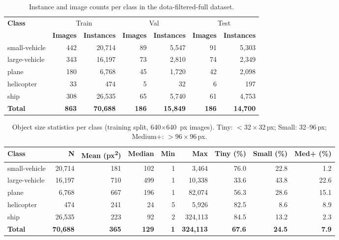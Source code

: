 \begin{table}[htbp]
\centering
\caption{Instance and image counts per class in the dota-filtered-full dataset.}
\label{tab:dota_filtered_full_counts}
\begin{tabular}{lrrrrrr}
\toprule
\textbf{Class} & \multicolumn{2}{c}{Train} & \multicolumn{2}{c}{Val} & \multicolumn{2}{c}{Test} \\
\cmidrule(lr){2-3} \cmidrule(lr){4-5} \cmidrule(lr){6-7}
 & \textbf{Images} & \textbf{Instances} & \textbf{Images} & \textbf{Instances} & \textbf{Images} & \textbf{Instances} \\
\midrule
small-vehicle & 442 & 20,714 & 89 & 5,547 & 91 & 5,303 \\
large-vehicle & 343 & 16,197 & 73 & 2,810 & 74 & 2,349 \\
plane & 180 & 6,768 & 45 & 1,720 & 42 & 2,098 \\
helicopter & 33 & 474 & 5 & 32 & 6 & 197 \\
ship & 308 & 26,535 & 65 & 5,740 & 61 & 4,753 \\
\midrule
\textbf{Total} & \textbf{863} & \textbf{70,688} & \textbf{186} & \textbf{15,849} & \textbf{186} & \textbf{14,700} \\
\bottomrule
\end{tabular}
\end{table}

\begin{table}[htbp]
\centering
\caption{Object size statistics per class (training split, 640$\times$640~px images). Tiny: $<$32\,$\times$\,32\,px; Small: 32--96\,px; Medium+: $>$96\,$\times$\,96\,px.}
\label{tab:dota_filtered_full_sizes}
\begin{tabular}{lrrrrrrrr}
\toprule
\textbf{Class} & \textbf{N} & \textbf{Mean (px\textsuperscript{2})} & \textbf{Median} & \textbf{Min} & \textbf{Max} & \textbf{Tiny (\%)} & \textbf{Small (\%)} & \textbf{Med+ (\%)} \\
\midrule
small-vehicle & 20,714 & 181 & 102 & 1 & 3,464 & 76.0 & 22.8 & 1.2 \\
large-vehicle & 16,197 & 710 & 499 & 1 & 10,338 & 33.6 & 43.8 & 22.6 \\
plane & 6,768 & 667 & 196 & 1 & 82,074 & 56.3 & 28.6 & 15.1 \\
helicopter & 474 & 241 & 24 & 5 & 5,926 & 82.5 & 8.6 & 8.9 \\
ship & 26,535 & 223 & 92 & 2 & 324,113 & 84.5 & 13.2 & 2.3 \\
\midrule
\textbf{Total} & \textbf{70,688} & \textbf{365} & \textbf{129} & \textbf{1} & \textbf{324,113} & \textbf{67.6} & \textbf{24.5} & \textbf{7.9} \\
\bottomrule
\end{tabular}
\end{table}
